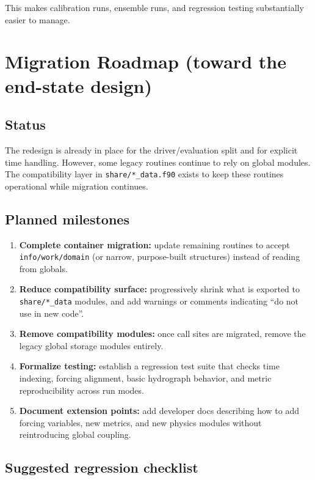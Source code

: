 \documentclass[11pt]{scrartcl}
\begin{document}
This makes calibration runs, ensemble runs, and regression testing substantially easier to manage.

\section{Migration Roadmap (toward the end-state design)}

\subsection{Status}

The redesign is already in place for the driver/evaluation split and for explicit time handling.
However, some legacy routines continue to rely on global modules. The compatibility layer in
\texttt{share/*\_data.f90} exists to keep these routines operational while migration continues.

\subsection{Planned milestones}

\begin{enumerate}[leftmargin=*]
\item \textbf{Complete container migration:} update remaining routines to accept \texttt{info/work/domain}
      (or narrow, purpose-built structures) instead of reading from globals.
\item \textbf{Reduce compatibility surface:} progressively shrink what is exported to \texttt{share/*\_data}
      modules, and add warnings or comments indicating ``do not use in new code''.
\item \textbf{Remove compatibility modules:} once call sites are migrated, remove the legacy global storage
      modules entirely.
\item \textbf{Formalize testing:} establish a regression test suite that checks time indexing, forcing alignment,
      basic hydrograph behavior, and metric reproducibility across run modes.
\item \textbf{Document extension points:} add developer docs describing how to add forcing variables, new metrics,
      and new physics modules without reintroducing global coupling.
\end{enumerate}

\subsection{Suggested regression checklist}
\end{document}
